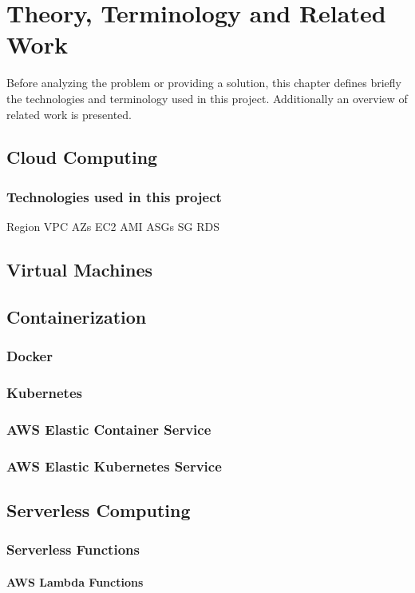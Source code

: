 \part{Theory, Terminology and Related Work}
\label{sec:theory}

Before analyzing the problem or providing a solution,
this chapter defines briefly the technologies and terminology used in this project.
Additionally an overview of related work is presented.

\chapter{Cloud Computing}
\section{Technologies used in this project}
Region
VPC
AZs
EC2
AMI
ASGs
SG
RDS

\chapter{Virtual Machines}

\chapter{Containerization}
\section{Docker}
\section{Kubernetes}
\section{AWS Elastic Container Service}
\section{AWS Elastic Kubernetes Service}

\chapter{Serverless Computing}
\section{Serverless Functions}
\subsection{AWS Lambda Functions}
